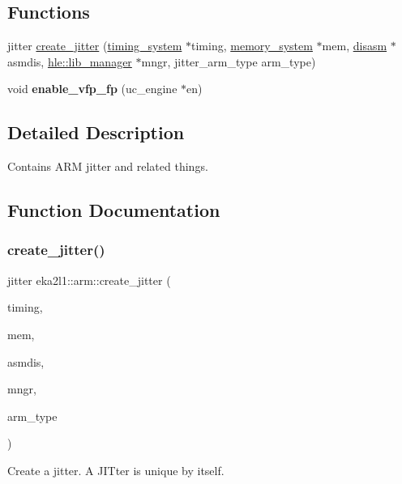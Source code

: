 \subsection*{Functions}
\begin{DoxyCompactItemize}
\item 
jitter \mbox{\hyperlink{namespaceeka2l1_1_1arm_a2624fec838c7341288465459694aa000}{create\+\_\+jitter}} (\mbox{\hyperlink{classeka2l1_1_1timing__system}{timing\+\_\+system}} $\ast$timing, \mbox{\hyperlink{classeka2l1_1_1memory__system}{memory\+\_\+system}} $\ast$mem, \mbox{\hyperlink{classeka2l1_1_1disasm}{disasm}} $\ast$asmdis, \mbox{\hyperlink{classeka2l1_1_1hle_1_1lib__manager}{hle\+::lib\+\_\+manager}} $\ast$mngr, jitter\+\_\+arm\+\_\+type arm\+\_\+type)
\item 
\mbox{\label{namespaceeka2l1_1_1arm_a55751631fe990369687393dabf0185cd}} 
void {\bfseries enable\+\_\+vfp\+\_\+fp} (uc\+\_\+engine $\ast$en)
\end{DoxyCompactItemize}


\subsection{Detailed Description}
Contains A\+RM jitter and related things. 

\subsection{Function Documentation}
\mbox{\label{namespaceeka2l1_1_1arm_a2624fec838c7341288465459694aa000}} 
\subsubsection{\texorpdfstring{create\+\_\+jitter()}{create\_jitter()}}
{\footnotesize\ttfamily jitter eka2l1\+::arm\+::create\+\_\+jitter (\begin{DoxyParamCaption}\item[{\mbox{\hyperlink{classeka2l1_1_1timing__system}{timing\+\_\+system}} $\ast$}]{timing,  }\item[{\mbox{\hyperlink{classeka2l1_1_1memory__system}{memory\+\_\+system}} $\ast$}]{mem,  }\item[{\mbox{\hyperlink{classeka2l1_1_1disasm}{disasm}} $\ast$}]{asmdis,  }\item[{\mbox{\hyperlink{classeka2l1_1_1hle_1_1lib__manager}{hle\+::lib\+\_\+manager}} $\ast$}]{mngr,  }\item[{jitter\+\_\+arm\+\_\+type}]{arm\+\_\+type }\end{DoxyParamCaption})}

Create a jitter. A J\+I\+Tter is unique by itself. 
